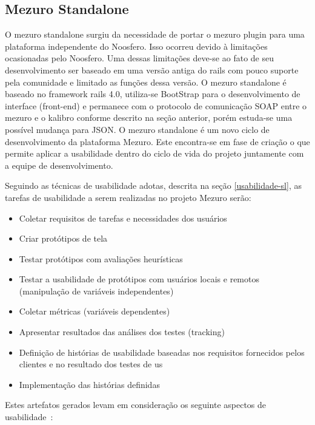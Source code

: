 \subsection{Mezuro Standalone}
\label{mezuro-standalone}

O mezuro standalone surgiu da necessidade de portar o mezuro plugin para uma plataforma independente do Noosfero. Isso ocorreu devido à limitações ocasionadas pelo Noosfero. Uma dessas limitações deve-se ao fato de seu desenvolvimento ser baseado em uma versão antiga do rails com pouco suporte pela comunidade e limitado as funções dessa versão.
O mezuro standalone é baseado no framework rails 4.0, utiliza-se BootStrap para o desenvolvimento de interface (front-end) e permanece com o protocolo de comunicação SOAP entre o mezuro e o kalibro conforme descrito na seção anterior, porém estuda-se uma possível mudança para JSON.
O mezuro standalone é um novo ciclo de desenvolvimento da plataforma Mezuro. Este encontra-se em fase de criação o que permite aplicar a usabilidade dentro do ciclo de vida do projeto juntamente com a equipe de desenvolvimento.

Seguindo as técnicas de usabilidade adotas, descrita na seção \ref{usabilidade-sl}, as tarefas de usabilidade a serem realizadas no projeto Mezuro serão:
\begin{itemize}
\item Coletar requisitos de tarefas e necessidades dos usuários
\item Criar protótipos de tela
\item Testar protótipos com avaliações heurísticas
\item Testar a usabilidade de protótipos com usuários locais e remotos (manipulação de variáveis independentes)
\item Coletar métricas (variáveis dependentes)
\item Apresentar resultados das análises dos testes (tracking)
\item Definição de histórias de usabilidade baseadas nos requisitos fornecidos pelos clientes e no resultado dos testes de us
\item Implementação das histórias definidas
\end{itemize}

Estes artefatos gerados levam em consideração os seguinte aspectos de usabilidade~\cite{ergolist2013}:

